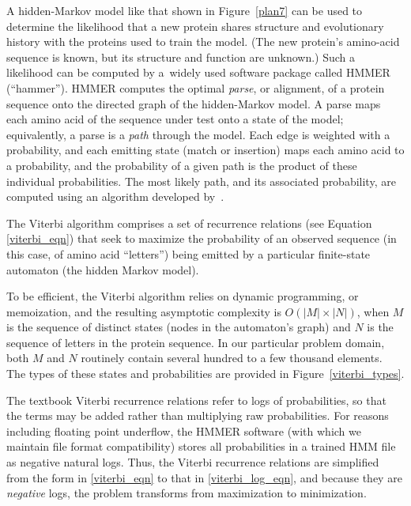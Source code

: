 \documentclass[preprint,nonatbib,blockstyle,nocopyrightspace,times]{sigplanconf}
\newcommand\figref[1]{Figure~\ref{#1}}
\begin{document}
A hidden-Markov model like that shown in \figref{plan7} can be used to
determine the likelihood that a new protein shares structure and
evolutionary history with the proteins used to train the model.
(The new protein's amino-acid sequence is known, but its structure and
function are unknown.)
Such a likelihood can be computed by
a~widely used software package called HMMER (``hammer'').
HMMER computes the optimal \textit{parse}, or 
alignment, of a protein sequence onto the directed graph of the hidden-Markov 
model.
A parse maps each amino acid of the sequence under test onto a state
of the model; equivalently, a parse is a \textit{path} through the model.
Each edge is weighted with a probability, and each emitting 
state (match or insertion) maps each amino acid to a probability,
and the 
probability of a given path is the product of these individual probabilities.
The most likely path, and its associated probability, are computed 
using an algorithm developed by~\citet{Viterbi:1967}.


The Viterbi algorithm comprises a set of recurrence 
relations (see Equation \ref{viterbi_eqn}) that seek to maximize the 
probability of an observed sequence (in this case, of amino acid ``letters'') 
being emitted by a particular finite-state automaton (the hidden Markov model).

To be efficient, the Viterbi 
algorithm relies on dynamic programming, or memoization, and the resulting 
asymptotic complexity is $O(|M|\times|N|)$, when $M$ is the sequence of 
distinct states (nodes in the automaton's graph) and $N$ is the sequence of 
letters in the protein sequence.
In our particular problem domain, both $M$ and 
$N$ routinely contain several hundred to a few thousand elements.
The types of 
these states and probabilities are provided in Figure~\ref{viterbi_types}.


\begin{figure}

\end{figure}


The textbook Viterbi recurrence relations refer to logs of probabilities, so 
that the terms may be added rather than multiplying raw probabilities.
For 
reasons including floating point underflow, the HMMER software (with which we 
maintain file format compatibility) stores all probabilities in a trained HMM 
file as negative natural logs.
Thus, the Viterbi recurrence relations are 
simplified from the form in \ref{viterbi_eqn} to that in \ref{viterbi_log_eqn}, 
and because they are \textit{negative} logs, the problem transforms from 
maximization to minimization.
\end{document}
